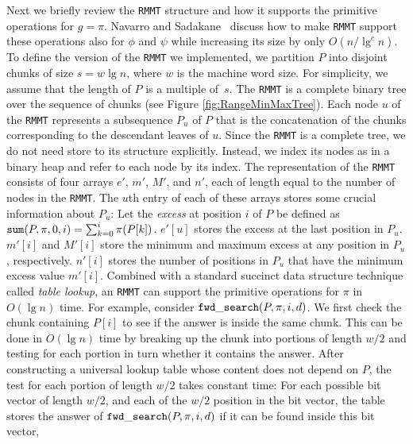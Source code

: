 Next we briefly review the {\tt RMMT} structure and how it supports
the primitive operations for $g = \pi$.  Navarro and
Sadakane~\cite{Navarro:2014:FFS:2620785.2601073} discuss how to make
{\tt RMMT} support these operations also for $\phi$ and $\psi$ while
increasing its size by only $O(n/\lg^c n)$.  To define the version of
the {\tt RMMT} we implemented, we partition $P$ into disjoint chunks
of size $s = w \lg n$, where $w$ is the machine word size.  For
simplicity, we assume that the length of $P$ is a multiple of~$s$.
The {\tt RMMT} is a complete binary tree over the sequence of
chunks (see Figure \ref{fig:RangeMinMaxTree}). Each node $u$ of the {\tt RMMT} represents a subsequence $P_u$
of $P$ that is the concatenation of the chunks corresponding to the
descendant leaves of $u$.  Since the {\tt RMMT} is a complete tree, we
do not need store to its structure explicitly.  Instead, we index its
nodes as in a binary heap and refer to each node by its index.  The
representation of the {\tt RMMT} consists of four arrays $e'$, $m'$,
$M'$, and $n'$, each of length equal to the number of nodes in the
{\tt RMMT}.  The $u$th entry of each of these arrays stores some
crucial information about $P_u$: Let the {\em excess} at position $i$
of $P$ be defined as $\mathtt{sum}(P,\pi,0,i) = \sum_{k=0}^{i} \pi(P[k])$.
$e'[u]$ stores the excess at the last position in $P_u$.  $m'[i]$ and
$M'[i]$ store the minimum and maximum excess at any position in $P_u$,
respectively.  $n'[i]$ stores the number of positions in $P_u$ that
have the minimum excess value $m'[i]$.
%
Combined with a standard succinct data structure technique called {\em
  table lookup}, an {\tt RMMT} can support the primitive operations
for $\pi$ in $O(\lg n)$ time.  For example, consider
$\mathtt{fwd\_search}(P,\pi,i,d)$.  We first check the chunk containing $P[i]$
to see if the answer is inside the same chunk.  This can be done in
$O(\lg n)$ time by breaking up the chunk into portions of length $w/2$
and testing for each portion in turn whether it contains the answer.
After constructing a universal lookup table whose content does not
depend on $P$, the test for each portion of length $w/2$ takes
constant time: For each possible bit vector of length $w/2$, and each
of the $w/2$ position in the bit vector, the table stores the answer
of $\mathtt{fwd\_search}(P,\pi,i,d)$ if it can be found inside this bit vector,
